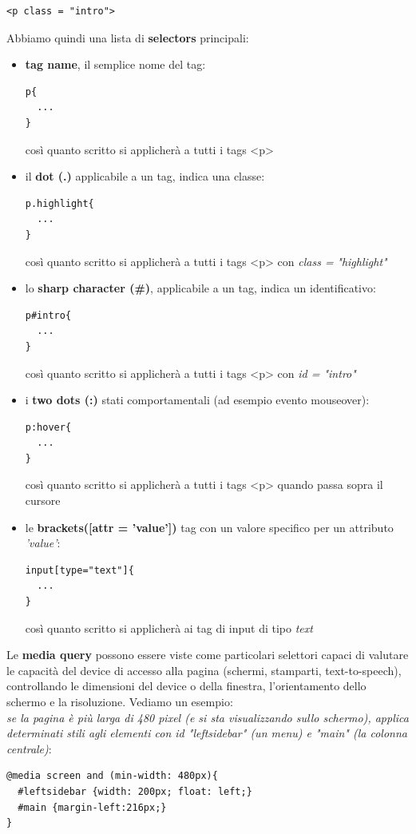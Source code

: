 \documentclass[a4paper,12pt, oneside]{book}
\begin{document}
\begin{verbatim}
<p class = "intro">
\end{verbatim}
Abbiamo quindi una lista di \textbf{selectors} principali:
\begin{itemize}
\item \textbf{tag name}, il semplice nome del tag:
\begin{verbatim}
p{
  ...
}
\end{verbatim}
così quanto scritto si applicherà a tutti i tags <p>
\item il \textbf{dot (.)} applicabile a un tag, indica una classe:
\begin{verbatim}
p.highlight{
  ...
}
\end{verbatim}
così quanto scritto si applicherà a tutti i tags <p> con \textit{class =} \textit{"highlight"}
\item lo \textbf{sharp character (\#)}, applicabile a un tag, indica un identificativo:
\begin{verbatim}
p#intro{
  ...
}
\end{verbatim}
così quanto scritto si applicherà a tutti i tags <p> con \textit{id = "intro"}
\item i \textbf{two dots (:)} stati comportamentali (ad esempio evento mouseover):
\begin{verbatim}
p:hover{
  ...
}
\end{verbatim}
così quanto scritto si applicherà a tutti i tags <p> quando passa sopra il cursore
\item le \textbf{brackets([attr = 'value'])} tag con un valore specifico per un attributo \textit{'value'}:
\begin{verbatim}
input[type="text"]{
  ...
}
\end{verbatim}
così quanto scritto si applicherà ai tag di input di tipo \textit{text}
\end{itemize}
Le \textbf{media query} possono essere viste come particolari selettori capaci di valutare le capacità del device di accesso alla pagina (schermi, stamparti, text-to-speech), controllando le dimensioni del device o della finestra, l'orientamento dello schermo e la risoluzione. Vediamo un esempio:\\
\textit{se la pagina è più larga di 480
pixel (e si sta visualizzando sullo schermo), applica
determinati stili agli elementi con id "leftsidebar" (un menu) e "main" (la colonna centrale)}:
\begin{verbatim}
@media screen and (min-width: 480px){
  #leftsidebar {width: 200px; float: left;}
  #main {margin-left:216px;}
}
\end{verbatim}
\end{document}
